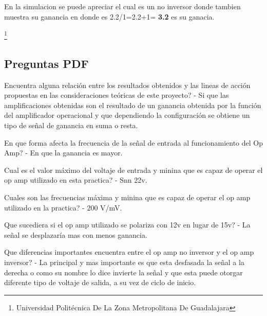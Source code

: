 \documentclass[10pt,a4paper]{article}
\begin{document}
En la simulacion se puede apreciar el cual es un no inversor donde tambien muestra su ganancia en donde es 2.2/1=2.2+1= \textbf{3.2} es su ganacia.

\footnote{Universidad Politécnica De La Zona Metropolitana De Guadalajara} 

\newpage



\subsection{Preguntas PDF}

Encuentra alguna relación entre los resultados obtenidos y las lineas de acción propuestas en las consideraciones teóricas de este proyecto? - Si que las amplificaciones obtenidas son el resultado de un ganancia obtenida por la función del amplificador operacional y que dependiendo la configuración se obtiene un tipo de señal de ganancia en suma o resta.

En que forma afecta la frecuencia de la señal de entrada al funcionamiento del Op Amp? - En que la ganancia es mayor.

Cual es el valor máximo del voltaje de entrada y minina que es capaz de operar el op amp utilizado en esta practica? - Snn 22v.

Cuales son las frecuencias máxima y minina que es capaz de operar el op amp utilizado en la practica? - 200 V/mV.

Que sucediera si el op amp utilizado se polariza con 12v en lugar de 15v?  - La señal se desplazaría mas con menos ganancia.

Que diferencias importantes encuentra entre el op amp no inversor y el op amp inversor? - La principal y mas importante es que esta desfasada la señal a la derecha o como su nombre lo dice invierte la señal y que esta puede otorgar diferente tipo de voltaje de salida, a su vez de ciclo de inicio.
\end{document}
